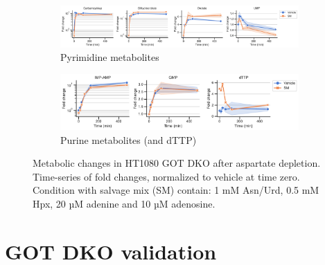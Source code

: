 \begin{figure}[!ht]
\begin{subfigure}[b]{0.9\textwidth}
         \label{fig:sapp:GOT_DKO_Asp_depl:HT1080_DKO_tca}
     \end{subfigure}
     \hfill
     \begin{subfigure}[b]{0.9\textwidth}
         \includegraphics[width=\textwidth]{figures/sapp/GOT_DKO_Asp_depl/HT1080_DKO_pyr.pdf}
         \caption{Pyrimidine metabolites}
         \label{fig:sapp:GOT_DKO_Asp_depl:HT1080_DKO_pyr}
     \end{subfigure}
     \hfill
     \begin{subfigure}[b]{0.68\textwidth}
         \includegraphics[width=\textwidth]{figures/sapp/GOT_DKO_Asp_depl/HT1080_DKO_pur.pdf}
         \caption{Purine metabolites (and dTTP)}
         \label{fig:sapp:GOT_DKO_Asp_depl:HT1080_DKO_pur}
     \end{subfigure}
     \hfill
        \caption[Metabolic changes in HT1080 after Asp depl.]{
        Metabolic changes in HT1080 GOT DKO after aspartate depletion.
        Time-series of fold changes, normalized to vehicle at time zero.
        Condition with salvage mix (SM) contain: 1 mM Asn/Urd, 0.5 mM Hpx, 20 µM adenine and 10 µM adenosine.
        }
        \label{fig:sapp:GOT_DKO_Asp_depl:HT1080_DKO_metab}
\end{figure}








\section{GOT DKO validation}





























